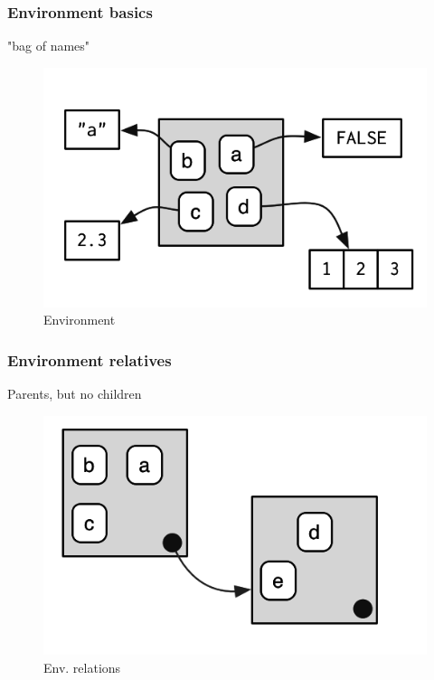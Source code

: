 \documentclass{beamer}
\begin{document}

\begin{frame}
	\frametitle{Environment basics}
	"bag of names"
	\lstEnvI
	\begin{figure}[!ht]
		\includegraphics[scale=0.90]{figures/bindingsenv}
		\caption{Environment}
		\label{fig:envi}
	\end{figure}
\end{frame}

\begin{frame}
	\frametitle{Environment relatives}
	\centerline{Parents, but no children}
	\begin{figure}[!ht]
		\includegraphics[scale=0.90]{figures/parents}
		\caption{Env. relations}
		\label{fig:envii}
	\end{figure}
\end{frame}
\end{document}
